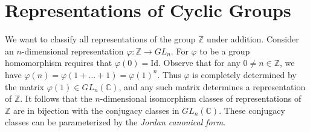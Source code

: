 %
\section{Representations of Cyclic Groups}
\begin{example}
We want to classify all representations of the group $\mathbb{Z}$ under addition.  Consider an $n$-dimensional representation $\varphi \colon \mathbb{Z} \to GL_n$.  For $\varphi$ to be a group homomorphism requires that $\varphi(0) = \text{Id}$.  Observe that for any $0 \neq n \in \mathbb{Z}$, we have $\varphi(n) = \varphi( 1 + \ldots + 1) = \varphi(1)^n$.  Thus $\varphi$ is completely determined by the matrix $\varphi(1) \in GL_n(\mathbb{C})$, and any such matrix determines a representation of $\mathbb{Z}$.  It follows that the $n$-dimensional isomorphism classes of representations of $\mathbb{Z}$ are in bijection with the conjugacy classes in $GL_n(\mathbb{C})$.  These conjugacy classes can be parameterized by the \textit{Jordan canonical form}.
\end{example}

